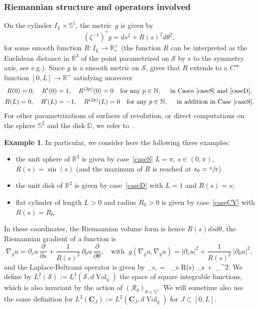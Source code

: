 \documentclass[10pt]{amsart}
\theoremstyle{definition}
\newtheorem{example}[lemma]{Example}
\newcommand{\calR}{\ensuremath{\mathcal R}}
\newcommand{\calS}{\ensuremath{\mathcal S}}
\newcommand{\mb}[1]{\ensuremath{\mathbb{#1}}}
\newcommand{\ID}{\ensuremath{\mathbb D}}
\newcommand{\N}{{\mb{N}}}
\newcommand{\R}{{\mb{R}}}
\newcommand{\bS}{\ensuremath{\mathbb S}}
\DeclareMathOperator{\Vol}{Vol}
\def\bal#1\nal{\begin{align*}#1\end{align*}}
\let\d\partial
\newcommand\CO[1]{\boldsymbol{C}_{\!#1}}
\providecommand{\eg}{e.g.}\providecommand{\ie}{i.e.}\providecommand{\etc}{etc.}
\begin{document}
\subsubsection*{Riemannian structure and operators involved}
On the cylinder $I_L\times \bS^1$, the metric~$g$ is given by
\begin{equation}
\label{e:metric-revol}
(\zeta^{-1})^*g = ds^2 + R(s)^2 d\theta^2,
\end{equation}
for some smooth function $R : I_L \to \R^+_*$ (the function $R$ can be interpreted as the Euclidean distance in $\R^3$ of the point parametrized on $\calS$ by $s$ to the symmetry axis, see \eg \cite[\S 3]{LL:18}). Since $g$ is a smooth metric on $\calS$, \cite[Prop.\,4.6]{Besse} gives that $R$ extends to a $C^\infty$ function $[0,L] \to \R^+$ satisfying moreover
\begin{gather}
\label{e:condR}
R(0) = 0, \quad R'(0) = 1, \quad R^{(2p)}(0) =0 \quad \text{for any } p \in \N, \quad \text{ in Cases~\ref{caseS} and~\ref{caseD}}, \\
R(L) = 0,\quad R'(L) = -1, \quad R^{(2p)}(L)=0 \quad \text{for any } p \in \N, \quad \text{ in addition in Case~\ref{caseS}}. \nonumber
\end{gather}
For other parametrizations of surfaces of revolution, or direct computations on the sphere $\bS^2$ and the disk $\ID$, we refer to~\cite[\S 3]{LL:18}.

\begin{example}
In particular, we consider here the following three examples:
\begin{itemize}
\item the unit sphere of $\R^3$ is given by case~\ref{caseS} $L=\pi$, $s\in (0,\pi)$, $R(s) = \sin(s)$ (and the maximum of $R$ is reached at $s_0= \sfrac{\pi}{2}$)
\item the unit disk of $\R^2$ is given by case~\ref{caseD} with $L=1$ and $R(s)=s$;
\item flat cylinder of length $L>0$ and radius $R_0>0$ is given by case~\ref{caseCY} with $R(s)= R_0$.
\end{itemize}
\end{example}
In these coordinates, the Riemannian volume form is hence $R(s) ds d\theta$, the Riemannian gradient of a function is
\begin{equation}
\label{e:reim-gradient}
\nabla_g u = \d_s u \,\frac{\d}{\d s} + \frac{1}{R(s)^2}\, \d_\theta u \,\frac{\d}{\d\theta}, \quad \text{with }\ g(\nabla_g u, \nabla_g u ) = |\d_s u|^2 + \frac{1}{R(s)^2}\, |\d_\theta u|^2,
\end{equation}
and the Laplace-Beltrami operator is given by
\bal
\Delta_{s,\theta} = \, \d_s R(s) \d_s +  \,\d_\theta^2.
\nal
We define by $L^2(\calS) := L^2(\calS, d\Vol_g)$ the space of square integrable functions, which is also invariant by the action of $(\calR_\theta)_{\theta \in \bS^1}$. We will sometime also use the same definition for $L^2(\CO{J}) := L^2(\CO{J}, d\Vol_g)$ for $J\subset [0,L]$.
\end{document}
